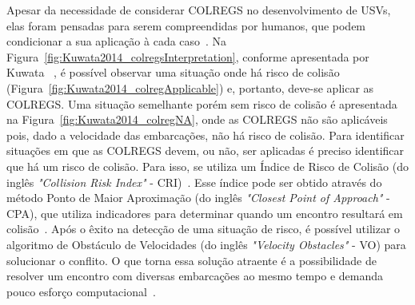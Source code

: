     Apesar da necessidade de considerar COLREGS no desenvolvimento de USVs, elas foram pensadas para serem compreendidas por humanos, que podem condicionar a sua aplicação à cada caso~\cite{KUWATA2014110}. Na Figura~\ref{fig:Kuwata2014_colregsInterpretation}, conforme apresentada por Kuwata \etal~\cite{KUWATA2014110}, é possível observar uma situação onde há risco de colisão (Figura~\ref{fig:Kuwata2014_colregApplicable}) e, portanto, deve-se aplicar as COLREGS. Uma situação semelhante porém sem risco de colisão é apresentada na Figura~\ref{fig:Kuwata2014_colregNA}, onde as COLREGS não são aplicáveis pois, dado a velocidade das embarcações, não há risco de colisão. Para identificar situações em que as COLREGS devem, ou não, ser aplicadas é preciso identificar que há um risco de colisão. Para isso, se utiliza um Índice de Risco de Colisão (do inglês \textit{"Collision Risk Index"} - CRI)~\cite{HUANG2019142}. Esse índice pode ser obtido através do método Ponto de Maior Aproximação (do inglês \textit{"Closest Point of Approach"} - CPA), que utiliza indicadores para determinar quando um encontro resultará em colisão~\cite{HUANG2020451}. Após o êxito na detecção de uma situação de risco, é possível utilizar o algoritmo de Obstáculo de Velocidades (do inglês \textit{"Velocity Obstacles"} - VO) para solucionar o conflito. O que torna essa solução atraente é a possibilidade de resolver um encontro com diversas embarcações ao mesmo tempo e demanda pouco esforço computacional~\cite{KUWATA2014110}.
    
